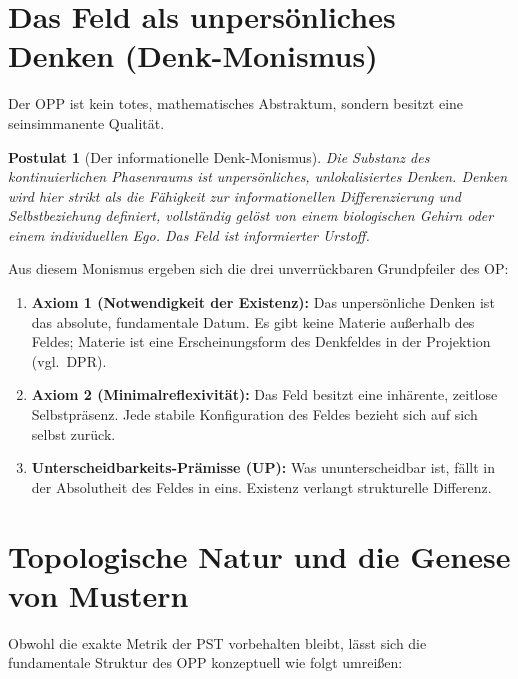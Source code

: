 \documentclass[11pt,a4paper]{article}
\theoremstyle{plain}
\newtheorem{postulate}{Postulat}[section]
\theoremstyle{definition}
\begin{document}
\section{Das Feld als unpers\"{o}nliches Denken (Denk-Monismus)}

Der OPP ist kein totes, mathematisches Abstraktum, sondern besitzt eine seinsimmanente
Qualit\"{a}t.

\begin{postulate}[Der informationelle Denk-Monismus]
Die Substanz des kontinuierlichen Phasenraums ist unpers\"{o}nliches, unlokalisiertes
Denken. Denken wird hier strikt als die \emph{F\"{a}higkeit zur informationellen
Differenzierung und Selbstbeziehung} definiert, vollst\"{a}ndig gel\"{o}st von einem
biologischen Gehirn oder einem individuellen Ego. Das Feld ist informierter Urstoff.
\end{postulate}

Aus diesem Monismus ergeben sich die drei unverr\"{u}ckbaren Grundpfeiler des OP:
\begin{enumerate}
  \item \textbf{Axiom 1 (Notwendigkeit der Existenz):} Das unpers\"{o}nliche Denken ist
        das absolute, fundamentale Datum. Es gibt keine Materie \glqq{}au\ss{}erhalb\grqq{}
        des Feldes; Materie ist eine Erscheinungsform des Denkfeldes in der Projektion
        (vgl.\ DPR).
  \item \textbf{Axiom 2 (Minimalreflexivit\"{a}t):} Das Feld besitzt eine inh\"{a}rente,
        zeitlose Selbstpr\"{a}senz. Jede stabile Konfiguration des Feldes bezieht sich
        auf sich selbst zur\"{u}ck.
  \item \textbf{Unterscheidbarkeits-Pr\"{a}misse (UP):} Was ununterscheidbar ist, f\"{a}llt
        in der Absolutheit des Feldes in eins. Existenz verlangt strukturelle Differenz.
\end{enumerate}

\section{Topologische Natur und die Genese von Mustern}

Obwohl die exakte Metrik der PST vorbehalten bleibt, l\"{a}sst sich die fundamentale
Struktur des OPP konzeptuell wie folgt umrei\ss{}en:
\end{document}
